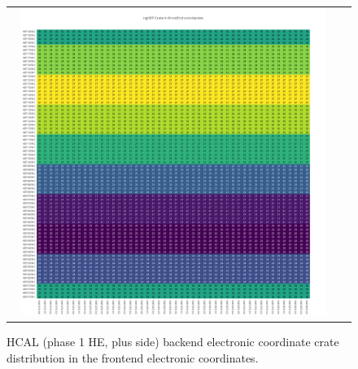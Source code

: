 \begin{figure}[htb]
 \begin{center}
  \begin{tabular}{cc}
   \includegraphics[angle=0,width=0.95\textwidth]{figures/appendix/ngHEP_Crate_in_FrontEnd.png}
  \end{tabular}
  \caption{HCAL (phase 1 HE, plus side) backend electronic coordinate crate distribution in the frontend electronic coordinates.}
  \label{fig:lmapngHEPCrateFEC}
 \end{center}
\end{figure}
\clearpage

